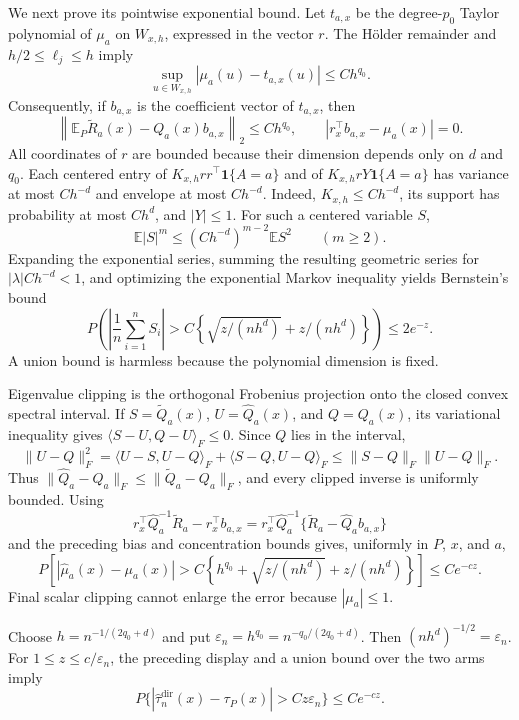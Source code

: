 We next prove its pointwise exponential bound. Let \(t_{a,x}\) be the degree-\(p_0\) Taylor polynomial of \(\mu_a\) on \(W_{x,h}\), expressed in the vector \(r\). The Hölder remainder and \(h/2\le\ell_j\le h\) imply
\[
 \sup_{u\in W_{x,h}}|\mu_a(u)-t_{a,x}(u)|\le C h^{q_0}.
\]
Consequently, if \(b_{a,x}\) is the coefficient vector of \(t_{a,x}\), then
\[
 \left\|\mathbb E_P\widetilde R_a(x)-Q_a(x)b_{a,x}\right\|_2\le C h^{q_0},
 \qquad
 |r_x^\top b_{a,x}-\mu_a(x)|=0.
\]
All coordinates of \(r\) are bounded because their dimension depends only on \(d\) and \(q_0\). Each centered entry of \(K_{x,h}rr^\top\mathbf 1\{A=a\}\) and of \(K_{x,h}rY\mathbf 1\{A=a\}\) has variance at most \(Ch^{-d}\) and envelope at most \(Ch^{-d}\). Indeed, \(K_{x,h}\le C h^{-d}\), its support has probability at most \(Ch^d\), and \(|Y|\le1\). For such a centered variable \(S\),
\[
 \mathbb E|S|^m\le (Ch^{-d})^{m-2}\mathbb E S^2\qquad(m\ge2).
\]
Expanding the exponential series, summing the resulting geometric series for \(|\lambda|Ch^{-d}<1\), and optimizing the exponential Markov inequality yields Bernstein's bound
\[
 P\!\left(\left|\frac1n\sum_{i=1}^nS_i\right|>
 C\left\{\sqrt{z/(nh^d)}+z/(nh^d)\right\}\right)\le2e^{-z}.
\]
A union bound is harmless because the polynomial dimension is fixed.

Eigenvalue clipping is the orthogonal Frobenius projection onto the closed convex spectral interval. If \(S=\widetilde Q_a(x)\), \(U=\widehat Q_a(x)\), and \(Q=Q_a(x)\), its variational inequality gives \(\langle S-U,Q-U\rangle_F\le0\). Since \(Q\) lies in the interval,
\[
 \|U-Q\|_F^2
 =\langle U-S,U-Q\rangle_F+\langle S-Q,U-Q\rangle_F
 \le\|S-Q\|_F\|U-Q\|_F.
\]
Thus \(\|\widehat Q_a-Q_a\|_F\le\|\widetilde Q_a-Q_a\|_F\), and every clipped inverse is uniformly bounded. Using
\[
 r_x^\top\widehat Q_a^{-1}\widetilde R_a-r_x^\top b_{a,x}
 =r_x^\top\widehat Q_a^{-1}
 \{\widetilde R_a-\widehat Q_a b_{a,x}\}
\]
and the preceding bias and concentration bounds gives, uniformly in \(P\), \(x\), and \(a\),
\[
 P\!\left[|\widehat\mu_a(x)-\mu_a(x)|>
 C\left\{h^{q_0}+\sqrt{z/(nh^d)}+z/(nh^d)\right\}\right]
 \le Ce^{-cz}.
\]
Final scalar clipping cannot enlarge the error because \(|\mu_a|\le1\).

Choose \(h=n^{-1/(2q_0+d)}\) and put \(\varepsilon_n=h^{q_0}=n^{-q_0/(2q_0+d)}\). Then \((nh^d)^{-1/2}=\varepsilon_n\). For \(1\le z\le c/\varepsilon_n\), the preceding display and a union bound over the two arms imply
\[
 P\{|\widehat\tau^{\mathrm{dir}}_n(x)-\tau_P(x)|>Cz\varepsilon_n\}
 \le Ce^{-cz}.
\]

